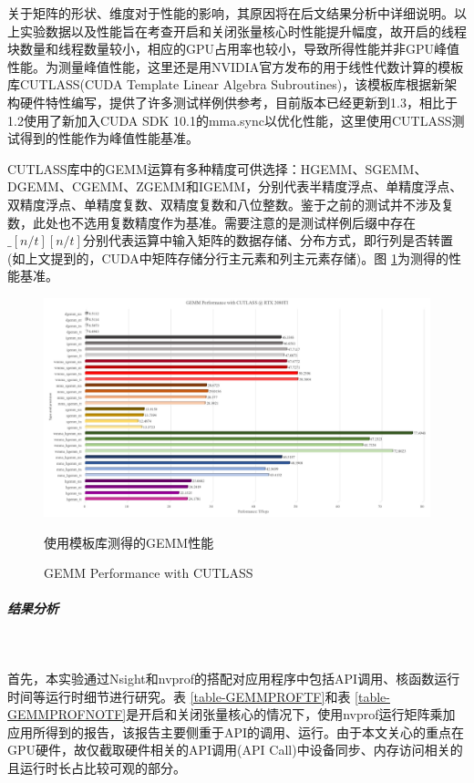 \par 关于矩阵的形状、维度对于性能的影响，其原因将在后文结果分析中详细说明。以上实验数据以及性能旨在考查开启和关闭张量核心时性能提升幅度，故开启的线程块数量和线程数量较小，相应的GPU占用率也较小，导致所得性能并非GPU峰值性能。为测量峰值性能，这里还是用NVIDIA官方发布的用于线性代数计算的模板库CUTLASS(CUDA Template Linear Algebra Subroutines)，该模板库根据新架构硬件特性编写，提供了许多测试样例供参考，目前版本已经更新到1.3，相比于1.2使用了新加入CUDA SDK 10.1的mma.sync以优化性能，这里使用CUTLASS测试得到的性能作为峰值性能基准。
\par CUTLASS库中的GEMM运算有多种精度可供选择：HGEMM、SGEMM、DGEMM、CGEMM、ZGEMM和IGEMM，分别代表半精度浮点、单精度浮点、双精度浮点、单精度复数、双精度复数和八位整数。鉴于之前的测试并不涉及复数，此处也不选用复数精度作为基准。需要注意的是测试样例后缀中存在$ \_[n/t][n/t] $分别代表运算中输入矩阵的数据存储、分布方式，即行列是否转置(如上文提到的，CUDA中矩阵存储分行主元素和列主元素存储)。图 \ref{Fig-GEMM-CUTLASS}为测得的性能基准。
\begin{figure}
	\centering
	\includegraphics[width=15cm]{figures/CUTLASSGEMM.jpg}
	\renewcommand{\thefigure}{\arabic{section}-\arabic{figure} }
	\renewcommand{\figurename}{图}
	\caption{使用模板库测得的GEMM性能}
	\addtocounter{figure}{-1}
	\renewcommand{\thefigure}{\arabic{section}-\arabic{figure} }
	\renewcommand{\figurename}{Figure}
	\caption{GEMM Performance with CUTLASS}
	\label{Fig-GEMM-CUTLASS}
\end{figure}
\subparagraph{结果分析}~{}
\par 首先，本实验通过Nsight和nvprof的搭配对应用程序中包括API调用、核函数运行时间等运行时细节进行研究。表 \ref{table-GEMMPROFTF}和表 \ref{table-GEMMPROFNOTF}是开启和关闭张量核心的情况下，使用nvprof运行矩阵乘加应用所得到的报告，该报告主要侧重于API的调用、运行。由于本文关心的重点在GPU硬件，故仅截取硬件相关的API调用(API Call)中设备同步、内存访问相关的且运行时长占比较可观的部分。
